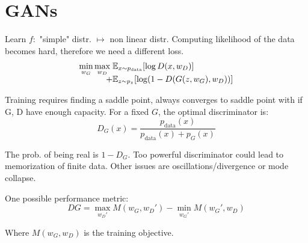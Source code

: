 \section*{GANs}

Learn $f:$ "simple" distr. $\mapsto$ non linear distr. Computing likelihood of the data becomes hard, therefore we need a different loss.
\begin{align*}
	\min_{w_G} \max_{w_D} \; & \mathbb{E}_{x \sim p_{\text{data}}} [\log D(x, w_D)] \\[-5pt]
 	+ &\mathbb{E}_{z \sim p_z} [\log (1 - D(G(z, w_G), w_D))]
\end{align*}
 
 Training requires finding a saddle point, always converges to saddle point with if G, D have enough capacity. For a fixed $G$, the optimal discriminator is:
 $$D_G(x) = \frac{p_{\text{data}}(x)}{p_{\text{data}}(x) + p_G(x)}$$
 
The prob. of being real is $1 - D_G$. Too powerful discriminator could lead to memorization of finite data. Other issues are oscillations/divergence or mode collapse. \smallskip
 
One possible performance metric:
$$DG = \max_{w_D'} M(w_G, w_D') - \min_{w_G'} M(w_G', w_D)$$
 
Where $M(w_G, w_D)$ is the training objective.
